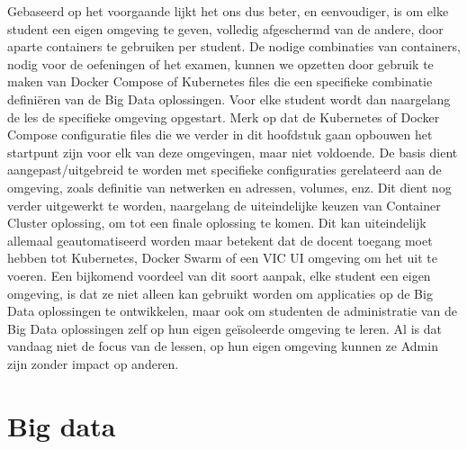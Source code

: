 \newline
Gebaseerd op het voorgaande lijkt het ons dus beter, en eenvoudiger, is om elke student een eigen omgeving te geven, volledig afgeschermd van de andere, door aparte containers te gebruiken per student.
\newline
De nodige combinaties van containers, nodig voor de oefeningen of het examen, kunnen we opzetten door gebruik te maken van Docker Compose of Kubernetes files die een specifieke combinatie definiëren van de Big Data oplossingen. Voor elke student wordt dan naargelang de les de specifieke omgeving opgestart.
\newline
Merk op dat de Kubernetes of Docker Compose configuratie files die we verder in dit hoofdstuk gaan opbouwen het startpunt zijn voor elk van deze omgevingen, maar niet voldoende. De basis dient aangepast/uitgebreid te worden met specifieke configuraties gerelateerd aan de omgeving, zoals definitie van netwerken en adressen, volumes, enz. Dit dient nog verder uitgewerkt te worden, naargelang de uiteindelijke keuzen van Container Cluster oplossing, om tot een finale oplossing te komen.
\newline
Dit kan uiteindelijk allemaal geautomatiseerd worden maar betekent dat de docent toegang moet hebben tot Kubernetes, Docker Swarm of een VIC UI omgeving om het uit te voeren.
\newline
Een bijkomend voordeel van dit soort aanpak, elke student een eigen omgeving, is dat ze niet alleen kan gebruikt worden om applicaties op de Big Data oplossingen te ontwikkelen, maar ook om studenten de administratie van de Big Data oplossingen zelf op hun eigen geïsoleerde omgeving te leren. Al is dat vandaag niet de focus van de lessen, op hun eigen omgeving kunnen ze Admin zijn zonder impact op anderen.
\newline
\newline


\section{Big data}

